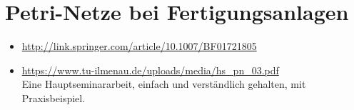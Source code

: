 \documentclass{article}
\begin{document}
\section{Petri-Netze bei Fertigungsanlagen}
\begin{itemize}
    \item \url{http://link.springer.com/article/10.1007/BF01721805} \\
    \item \url{https://www.tu-ilmenau.de/uploads/media/hs_pn_03.pdf} \\
        Eine Hauptseminararbeit, einfach und verständlich gehalten, mit Praxisbeispiel.
\end{itemize}
\end{document}
